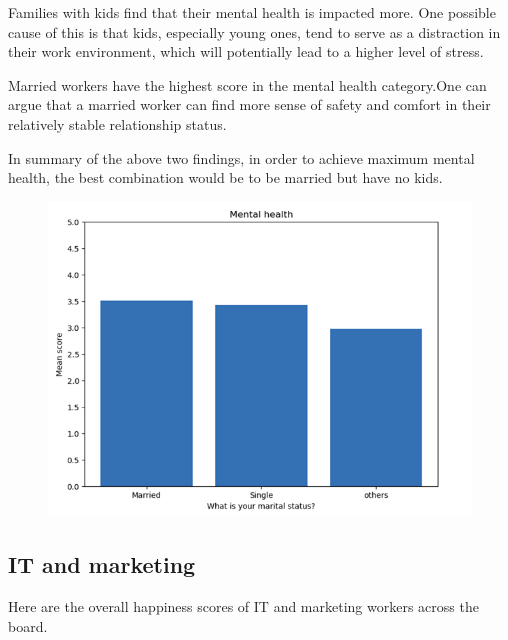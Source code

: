 \documentclass[12pt]{article}
\begin{document}
Families with kids find that their mental health is impacted more. One possible cause of this is that kids, especially young ones, tend to serve as a distraction in their work environment, which will potentially lead to a higher level of stress. 

Married workers have the highest score in the mental health category.One can argue that a married worker can find more sense of safety and comfort in their relatively stable relationship status. 

In summary of the above two findings, in order to achieve maximum mental health, the best combination would be to be married but have no kids.

\begin{figure}[H]
    \centering
    \includegraphics[scale=1]{marriage.png}
    \label{marriage}
\end{figure} 

\subsection*{IT and marketing}

Here are the overall happiness scores of IT and marketing workers across the board.
\end{document}
